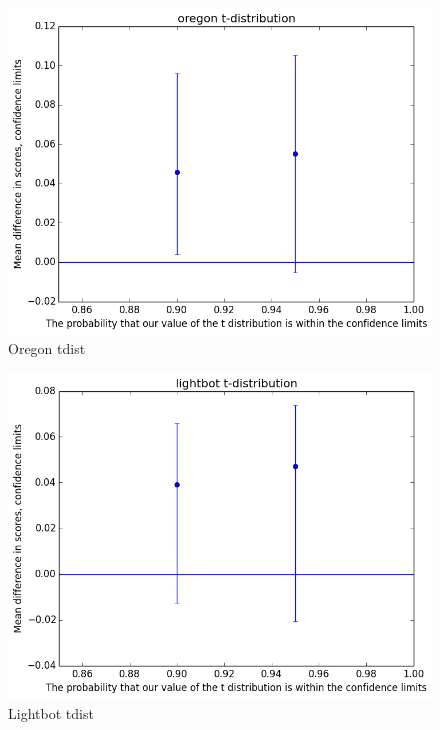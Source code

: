 			\begin{figure}[h] 
				\centering 
				\includegraphics[width=\textwidth]{oregon_tdist.png} 
				\caption{Oregon tdist}
			\end{figure}
			\begin{figure}[h] 
				\centering 
				\includegraphics[width=\textwidth]{lightbot_tdist.png} 
				\caption{Lightbot tdist}
			\end{figure}
